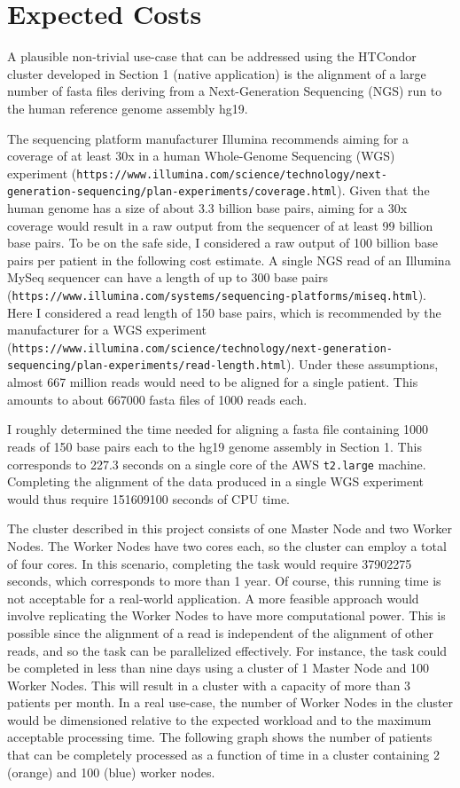 \documentclass{article}
\begin{document}
\section{Expected Costs}
A plausible non-trivial use-case that can be addressed using the HTCondor cluster developed in Section 1 (native application) is the alignment of a large number of fasta files deriving from a Next-Generation Sequencing (NGS) run to the human reference genome assembly hg19.

The sequencing platform manufacturer Illumina recommends aiming for a coverage of at least 30x in a human Whole-Genome Sequencing (WGS) experiment (\texttt{https://www.illumina.com/science/technology/next-generation-sequencing/plan-experiments/coverage.html}).
Given that the human genome has a size of about 3.3 billion base pairs, aiming for a 30x coverage would result in a raw output from the sequencer of at least 99 billion base pairs.
To be on the safe side, I considered a raw output of 100 billion base pairs per patient in the following cost estimate.
A single NGS read of an Illumina MySeq sequencer can have a length of up to 300 base pairs (\texttt{https://www.illumina.com/systems/sequencing-platforms/miseq.html}). Here I considered a read length of 150 base pairs, which is recommended by the manufacturer for a WGS experiment (\texttt{https://www.illumina.com/science/technology/next-generation-sequencing/plan-experiments/read-length.html}).
Under these assumptions, almost 667 million reads would need to be aligned for a single patient.
This amounts to about 667000 fasta files of 1000 reads each.

I roughly determined the time needed for aligning a fasta file containing 1000 reads of 150 base pairs each to the hg19 genome assembly in Section 1.
This corresponds to 227.3 seconds on a single core of the AWS \texttt{t2.large} machine.
Completing the alignment of the data produced in a single WGS experiment would thus require 151609100 seconds of CPU time.

The cluster described in this project consists of one Master Node and two Worker Nodes.
The Worker Nodes have two cores each, so the cluster can employ a total of four cores.
In this scenario, completing the task would require 37902275 seconds, which corresponds to more than 1 year.
Of course, this running time is not acceptable for a real-world application.
A more feasible approach would involve replicating the Worker Nodes to have more computational power.
This is possible since the alignment of a read is independent of the alignment of other reads, and so the task can be parallelized effectively.
For instance, the task could be completed in less than nine days using a cluster of 1 Master Node and 100 Worker Nodes.
This will result in a cluster with a capacity of more than 3 patients per month.
In a real use-case, the number of Worker Nodes in the cluster would be dimensioned relative to the expected workload and to the maximum acceptable processing time.
The following graph shows the number of patients that can be completely processed as a function of time in a cluster containing 2 (orange) and 100 (blue) worker nodes.
\end{document}
